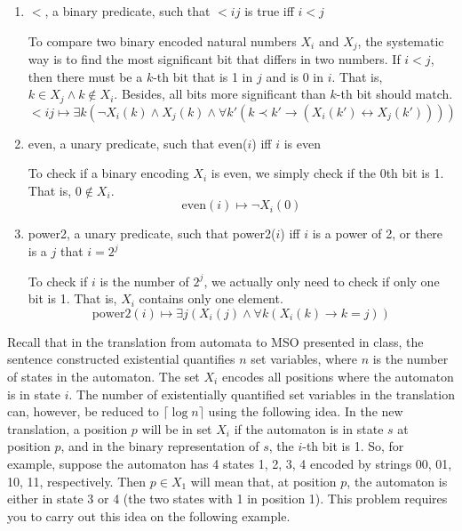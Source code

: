 \documentclass[11pt]{homework}
\begin{document}
\begin{enumerate}
    \item \(<\), a binary predicate, such that \(< ij\) is true iff \(i < j\)

      To compare two binary encoded natural numbers \(X_i\) and \(X_j\),
      the systematic way is to find the most significant bit that differs in two numbers.
      If \(i < j\), then there must be a \(k\)-th bit that is 1 in \(j\) and is 0 in \(i\).
      That is, \(k \in X_j \land k \not\in X_i\).
      Besides, all bits more significant than \(k\)-th bit should match.
\[
    < ij \mapsto \exists k(\neg X_i(k) \land X_j(k) \land 
    \forall k'(k \prec k' \to (X_i(k') \leftrightarrow X_j(k'))) )
\]

    \item even, a unary predicate, such that even(\(i\)) iff \(i\) is even
      
      To check if a binary encoding \(X_i\) is even,
      we simply check if the 0th bit is 1. That is, \(0 \not\in X_i\).
\[
	\text{even}(i) \mapsto \neg X_i(0)
\]

    \item power2, a unary predicate,
    such that power2(\(i\)) iff \(i\) is a power of 2,
    or there is a \(j\) that \(i = 2^j\)
    
      To check if \(i\) is the number of \(2^j\),
      we actually only need to check if only one bit is 1.
      That is, \(X_i\) contains only one element.
\[
	\text{power2}(i) \mapsto \exists j( X_i(j) \land \forall k(X_i(k) \to k=j))
\]

\end{enumerate}

\question
Recall that in the translation from automata to MSO presented in class,
the sentence constructed existential quantifies \(n\) set variables,
where \(n\) is the number of states in the automaton.
The set \(X_i\) encodes all positions where the automaton is in state \(i\).  
The number of existentially quantified set variables in the translation can,
however, be reduced to \(\lceil \log n \rceil\) using the following idea.
In the new translation, a position \(p\) will be in set \(X_i\)
if the automaton is in state \(s\) at position \(p\),
and in the binary representation of \(s\),
the \(i\)-th bit is 1.
So, for example, suppose the automaton has 4 states 1, 2, 3, 4 encoded by strings 00, 01, 10, 11, respectively.
Then \(p \in X_1\) will mean that, at position \(p\),
the automaton is either in state 3 or 4 (the two states with 1 in position 1).
This problem requires you to carry out this idea on the following example.
\end{document}
